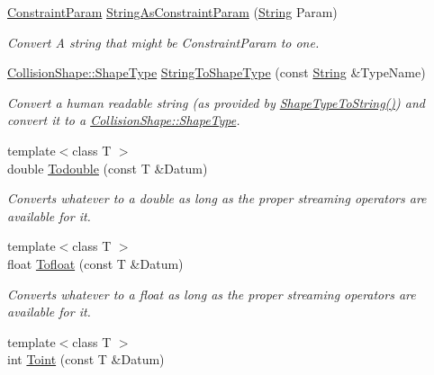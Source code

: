 \begin{DoxyCompactItemize}
\hyperlink{namespaceMezzanine_a6c62e8c2938fb203eb7a7072c12176f4}{ConstraintParam} \hyperlink{namespaceMezzanine_a198eb79806849ed29c2a329b60a094ab}{StringAsConstraintParam} (\hyperlink{namespaceMezzanine_acf9fcc130e6ebf08e3d8491aebcf1c86}{String} Param)
\begin{DoxyCompactList}\small\item\em Convert A string that might be ConstraintParam to one. \item\end{DoxyCompactList}\item 
\hyperlink{classMezzanine_1_1CollisionShape_ad04186055565998879b64176d6dd100d}{CollisionShape::ShapeType} \hyperlink{namespaceMezzanine_acae3fd66fbd56ed04a8d61bebee11769}{StringToShapeType} (const \hyperlink{namespaceMezzanine_acf9fcc130e6ebf08e3d8491aebcf1c86}{String} \&TypeName)
\begin{DoxyCompactList}\small\item\em Convert a human readable string (as provided by \hyperlink{namespaceMezzanine_a52369c62b87ecdbfbc6b82a572f21651}{ShapeTypeToString()}) and convert it to a \hyperlink{classMezzanine_1_1CollisionShape_ad04186055565998879b64176d6dd100d}{CollisionShape::ShapeType}. \item\end{DoxyCompactList}\item 
{\footnotesize template$<$class T $>$ }\\double \hyperlink{namespaceMezzanine_a2d68761c8584c5b332d5163d268dad5f}{Todouble} (const T \&Datum)
\begin{DoxyCompactList}\small\item\em Converts whatever to a double as long as the proper streaming operators are available for it. \item\end{DoxyCompactList}\item 
{\footnotesize template$<$class T $>$ }\\float \hyperlink{namespaceMezzanine_a033b1e899e15516a76027b1090942d69}{Tofloat} (const T \&Datum)
\begin{DoxyCompactList}\small\item\em Converts whatever to a float as long as the proper streaming operators are available for it. \item\end{DoxyCompactList}\item 
{\footnotesize template$<$class T $>$ }\\int \hyperlink{namespaceMezzanine_aadc9a78cb1529bed06ae6645aa64e26b}{Toint} (const T \&Datum)

\end{DoxyCompactItemize}
